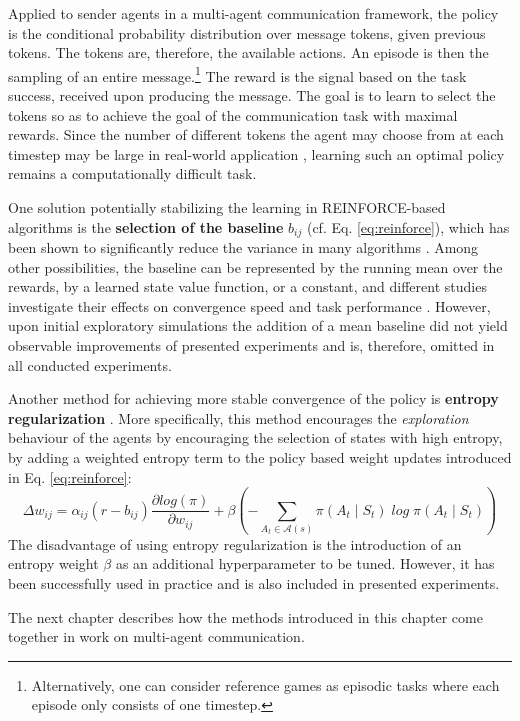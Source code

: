 Applied to sender agents in a multi-agent communication framework, the policy is the conditional probability distribution over message tokens, given previous tokens. The tokens are, therefore, the available actions. An episode is then the sampling of an entire message.\footnote{Alternatively, one can consider reference games as episodic tasks where each episode only consists of one timestep.} The reward is the signal based on the task success, received upon producing the message. The goal is to learn to select the tokens so as to achieve the goal of the communication task with maximal rewards. Since the number of different tokens the agent may choose from at each timestep may be large in real-world application \parencite[cf.][]{he2015deep}, learning such an optimal policy remains a computationally difficult task.

One solution potentially stabilizing the learning in REINFORCE-based algorithms is the \textbf{selection of the baseline} $b_{ij}$ (cf. Eq. \ref{eq:reinforce}), which has been shown to significantly reduce the variance in many algorithms \parencite{sutton2018reinforcement}. 
Among other possibilities, the baseline can be represented by the running mean over the rewards, by a learned state value function, or a constant, and different studies investigate their effects on convergence speed and task performance \parencite{williams1992simple, greensmith2004variance}. However, upon initial exploratory simulations the addition of a mean baseline did not yield observable improvements of presented experiments and is, therefore, omitted in all conducted experiments. 

Another method for achieving more stable convergence of the policy is \textbf{entropy regularization} \parencite{williams1991function, mnih2016asynchronous}. More specifically, this method encourages the \textit{exploration} behaviour of the agents by encouraging the selection of states with high entropy, by adding a weighted entropy term to the policy based weight updates introduced in Eq. \ref{eq:reinforce}: 
\begin{equation}
\Delta w_{ij} = \alpha_{ij} (r - b_{ij}) \frac{\partial log(\pi)}{\partial w_{ij}} + \beta (- \sum_{A_t \in \mathcal{A}(s)} \pi(A_t \mid S_t) \; log \; \pi(A_t \mid S_t))
\end{equation}
The disadvantage of using entropy regularization is the introduction of an entropy weight $\beta$ as an additional hyperparameter to be tuned. However, it has been successfully used in practice and is also included in presented experiments.


The next chapter describes how the methods introduced in this chapter come together in work on multi-agent communication.

